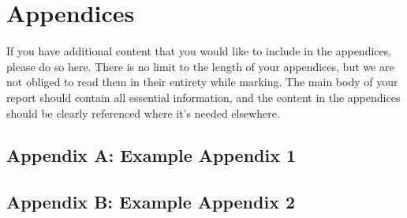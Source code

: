 \documentclass{article}
\begin{document}
\newpage
 
 

\normalsize
\newpage
\section*{Appendices}
If you have additional content that you would like to include in the appendices, please do so here.
There is no limit to the length of your appendices, but we are not obliged to read them in their entirety while marking. The main body of your report should contain all essential information, and the content in the appendices should be clearly referenced where it's needed elsewhere.
\subsection*{Appendix A: Example Appendix 1}
\subsection*{Appendix B: Example Appendix 2}
\end{document}
